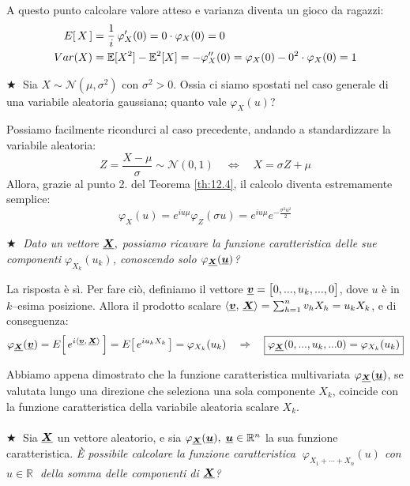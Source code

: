 A questo punto calcolare valore atteso e varianza diventa un gioco da ragazzi:
\begin{align*}
    E\!\left[\,X\,\right] &= \frac{1}{i}\,\varphi'_X(0) = 0 \cdot \varphi_X(0) = 0\\
    Var(X) &= \mathbb{E}[X^2] - \mathbb{E}^2[X] = -\varphi_X''(0) = \varphi_X(0) - 0^2 \cdot \varphi_X(0) = 1
\end{align*}

\noindent \(\bigstar \;\) Sia $X\sim\mathcal{N}(\mu, \sigma^2)$ con $\sigma^2>0$. Ossia ci siamo spostati nel caso generale di una variabile aleatoria gaussiana; quanto vale $\varphi_X(u)$? 

\medskip
\noindent Possiamo facilmente ricondurci al caso precedente, andando a standardizzare la variabile aleatoria:
\[Z = \frac{X-\mu}{\sigma}\sim\mathcal{N}(0, 1)\quad \iff \quad X = \sigma Z + \mu\]
Allora, grazie al punto 2. del Teorema \ref{th:12.4}, il calcolo diventa estremamente semplice:
\[\boxed{\varphi_X(u) = e^{iu\mu}\varphi_Z(\sigma u) = e^{iu\mu} e^{-\frac{\sigma^2 u^2}{2}}}\]

\noindent \(\bigstar \;\) \textit{Dato un vettore $\underline{{\boldsymbol{X}}}, $ possiamo ricavare la funzione caratteristica delle sue componenti $\varphi_{X_k}(u_k)$, conoscendo solo $\varphi_{\underline{{\boldsymbol{X}}}}(\underline{{\boldsymbol{u}}})$?} 
\label{pag:107}

\medskip
\noindent La risposta è sì. Per fare ciò, definiamo il vettore $\underline{{\boldsymbol{v}}} = \begin{bmatrix} 0, ..., u_k, ..., 0\end{bmatrix}$, dove $u$ è in $k$--esima posizione. Allora il prodotto scalare $\left\langle \underline{{\boldsymbol{v}}},\, \underline{{\boldsymbol{X}}} \right\rangle = \sum_{h=1}^n v_h X_h = u_k X_k$, e di conseguenza:
\[\varphi_{\underline{{\boldsymbol{X}}}}(\underline{{\boldsymbol{v}}}) = E\!\left[\,e^{i\left\langle \underline{{\boldsymbol{v}}},\, \underline{{\boldsymbol{X}}} \right\rangle}\,\right] = E\!\left[\,e^{iu_kX_k}\,\right] = \varphi_{X_k}(u_k)\quad \Rightarrow \quad \boxed{\varphi_{\underline{{\boldsymbol{X}}}}(0, ..., u_k, ...0) = \varphi_{X_k}(u_k)}\]

Abbiamo appena dimostrato che la funzione caratteristica multivariata $\varphi_{\underline{{\boldsymbol{X}}}}(\underline{{\boldsymbol{u}}})$, se valutata lungo una direzione che seleziona una sola componente $X_k$, coincide con la funzione caratteristica della variabile aleatoria scalare $X_k$.\\
\\
\(\bigstar \;\) Sia $\underline{{\boldsymbol{X}}}$ un vettore aleatorio, e sia $\varphi_{\underline{{\boldsymbol{X}}}}(\underline{{\boldsymbol{u}}}), \;\underline{{\boldsymbol{u}}}\in\mathbb{R}^n$ la sua funzione caratteristica. \textit{È possibile calcolare la funzione caratteristica $\; \varphi_{X_1+\cdots+X_n}(u)$ con $u\in\mathbb{R}\; $ della somma delle componenti di $\underline{{\boldsymbol{X}}}$?}

